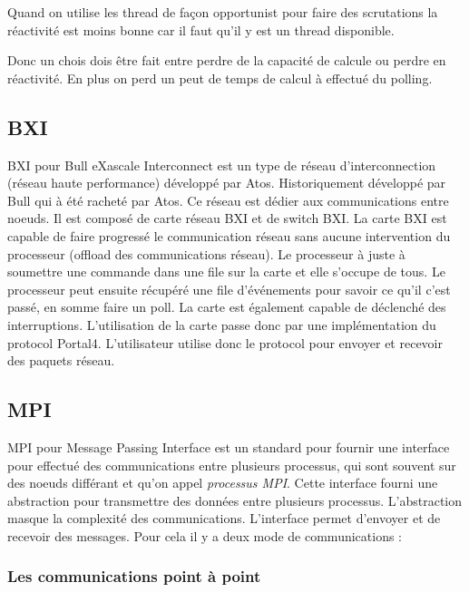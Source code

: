 Quand on utilise les thread de façon opportunist pour faire des scrutations la réactivité est moins bonne car il faut qu'il y est un thread disponible.

Donc un chois dois être fait entre perdre de la capacité de calcule ou perdre en réactivité.
En plus on perd un peut de temps de calcul à effectué du polling.

\subsection{BXI}

BXI pour Bull eXascale Interconnect est un type de réseau d'interconnection (réseau haute performance) développé par Atos.
Historiquement développé par Bull qui à été racheté par Atos.
Ce réseau est dédier aux communications entre noeuds. Il est composé de carte réseau BXI et de switch BXI.
La carte BXI est capable de faire progressé le communication réseau sans aucune intervention du processeur (offload des communications réseau). %
Le processeur à juste à soumettre une commande dans une file sur la carte et elle s'occupe de tous.
Le processeur peut ensuite récupéré une file d'événements pour savoir ce qu'il c'est passé, en somme faire un poll.
La carte est également capable de déclenché des interruptions.
L'utilisation de la carte passe donc par une implémentation du protocol Portal4.
L'utilisateur utilise donc le protocol pour envoyer et recevoir des paquets réseau.

\subsection{MPI}

MPI pour Message Passing Interface est un standard pour fournir une interface pour effectué des communications entre plusieurs processus, qui sont souvent sur des noeuds différant et qu'on appel \emph{processus MPI}.
Cette interface fourni une abstraction pour transmettre des données entre plusieurs processus.
L'abstraction masque la complexité des communications.
L'interface permet d'envoyer et de recevoir des messages. Pour cela il y a deux mode de communications :

\subsubsection{Les communications point à point}

